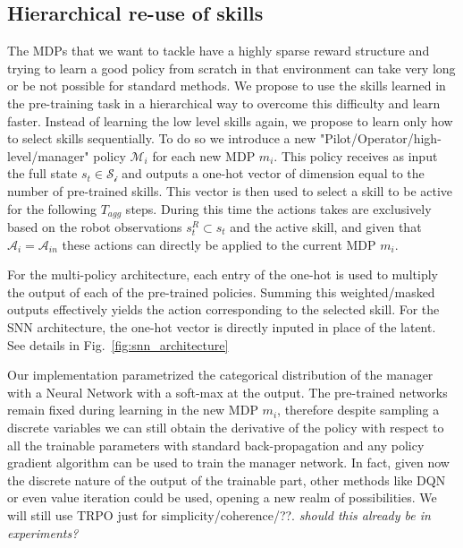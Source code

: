 \documentclass{article} %
\begin{document}
\subsection{Hierarchical re-use of skills}
The MDPs that we want to tackle have a highly sparse reward structure and trying to learn a good policy from scratch in that environment can take very long or be not possible for standard methods. We propose to use the skills learned in the pre-training task in a hierarchical way to overcome this difficulty and learn faster. Instead of learning the low level skills again, we propose to learn only how to select skills sequentially. To do so we introduce a new "Pilot/Operator/high-level/manager" policy $\mathcal{M}_i$ for each new MDP $m_i$. This policy receives as input the full state $s_t\in \mathcal{S_i}$ and outputs a one-hot vector of dimension equal to the number of pre-trained skills. This vector is then used to select a skill to be active for the following $T_{agg}$ steps. During this time the actions takes are exclusively based on the robot observations $s^R_t\subset s_t$ and the active skill, and given that $\mathcal{A}_i = \mathcal{A}_{in}$ these actions can directly be applied to the current MDP $m_i$.


For the multi-policy architecture, each entry of the one-hot is used to multiply the output of each of the pre-trained policies. Summing this weighted/masked outputs effectively yields the action corresponding to the selected skill. For the SNN architecture, the one-hot vector is directly inputed in place of the latent. See details in Fig.\ \ref{fig:snn_architecture}

Our implementation parametrized the categorical distribution of the manager with a Neural Network with a soft-max at the output. The pre-trained networks remain fixed during learning in the new MDP $m_i$, therefore despite sampling a discrete variables we can still obtain the derivative of the policy with respect to all the trainable parameters with standard back-propagation and any policy gradient algorithm can be used to train the manager network. In fact, given now the discrete nature of the output of the trainable part, other methods like DQN or even value iteration could be used, opening a new realm of possibilities. We will still use TRPO just for simplicity/coherence/??. \textit{should this already be in experiments?}
\end{document}
